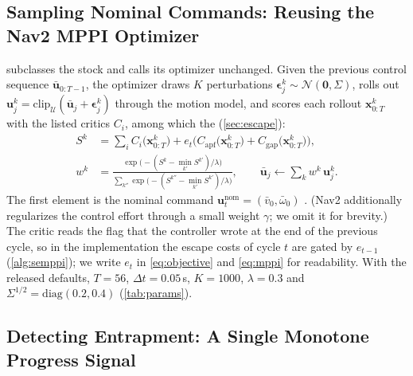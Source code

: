 \subsection{Sampling Nominal Commands: Reusing the Nav2 MPPI Optimizer}\label{sec:sample}

\sname{} subclasses the stock  and calls its optimizer unchanged. Given the previous control sequence $\bar{\mathbf{u}}_{0:T-1}$, the optimizer draws $K$ perturbations $\boldsymbol{\epsilon}^k_j\sim\mathcal{N}(\mathbf{0},\Sigma)$, rolls out $\mathbf{u}^k_j=\mathrm{clip}_{\mathcal{U}}(\bar{\mathbf{u}}_j+\boldsymbol{\epsilon}^k_j)$ through the motion model, and scores each rollout $\mathbf{x}^k_{0:T}$ with the listed critics $C_i$, among which the  (\cref{sec:escape}):
\begin{equation}\label{eq:mppi}
\begin{aligned}
S^k&=\sum_i C_i\big(\mathbf{x}^k_{0:T}\big)+e_t\Big(C_{\mathrm{apf}}\big(\mathbf{x}^k_{0:T}\big)+C_{\mathrm{gap}}\big(\mathbf{x}^k_{0:T}\big)\Big),\\
w^k&=\frac{\exp\!\big(-(S^k-\min_{k'}S^{k'})/\lambda\big)}{\sum_{k''}\exp\!\big(-(S^{k''}-\min_{k'}S^{k'})/\lambda\big)},\qquad
\bar{\mathbf{u}}_j\leftarrow\sum_k w^k\,\mathbf{u}^k_j .
\end{aligned}
\end{equation}
The first element is the nominal command $\mathbf{u}^{\mathrm{nom}}_t=(\bar v_0,\bar\omega_0)$ \citep{mppi_orig}. (Nav2 additionally regularizes the control effort through a small weight $\gamma$; we omit it for brevity.) The critic reads the flag that the controller wrote at the end of the previous cycle, so in the implementation the escape costs of cycle $t$ are gated by $e_{t-1}$ (\cref{alg:semppi}); we write $e_t$ in \eqref{eq:objective} and \eqref{eq:mppi} for readability. With the released defaults, $T=56$, $\Delta t=0.05$\,s, $K=1000$, $\lambda=0.3$ and $\Sigma^{1/2}=\mathrm{diag}(0.2,0.4)$ (\cref{tab:params}).

\subsection{Detecting Entrapment: A Single Monotone Progress Signal}\label{sec:detect}

